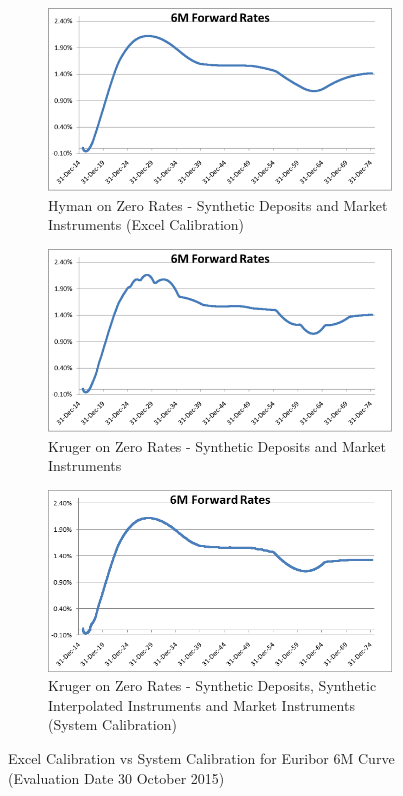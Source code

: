 \begin{figure}
\centering
\begin{subfigure}[b]{0.7\textwidth}
\includegraphics[width=\textwidth]{images/9a.png}
\caption{Hyman on Zero Rates - Synthetic Deposits and Market Instruments (Excel Calibration)}
\label{fig:9a}
\end{subfigure}
\begin{subfigure}[b]{0.7\textwidth}
\includegraphics[width=\textwidth]{images/9b.png}
\caption{Kruger on Zero Rates - Synthetic Deposits and Market Instruments}
\label{fig:9b}
\end{subfigure}
\begin{subfigure}[b]{0.7\textwidth}
\includegraphics[width=\textwidth]{images/9c.png}
\caption{Kruger on Zero Rates - Synthetic Deposits, Synthetic Interpolated Instruments and Market Instruments (System Calibration)}
\label{fig:9c}
\end{subfigure}
\caption{Excel Calibration vs System Calibration for Euribor 6M Curve (Evaluation Date 30 October 2015)}
\label{fig:9}
\end{figure}

